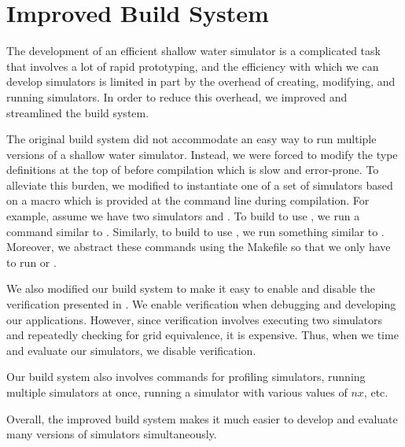 \section{Improved Build System}\label{sec:build}
The development of an efficient shallow water simulator is a complicated task
that involves a lot of rapid prototyping, and the efficiency with which we can
develop simulators is limited in part by the overhead of creating, modifying,
and running simulators. In order to reduce this overhead, we improved and
streamlined the build system.

The original  build system did not accommodate an easy way to run
multiple versions of a shallow water simulator. Instead, we were forced to
modify the type definitions at the top of  before compilation
which is slow and error-prone. To alleviate this burden, we modified
 to instantiate one of a set of simulators based on a macro
which is provided at the command line during compilation. For example, assume
we have two simulators  and . To build  to
use , we run a command similar to . Similarly, to build  to use ,
we run something similar to .
Moreover, we abstract these commands using the Makefile so that we only have to
run  or .

We also modified our build system to make it easy to enable and disable the
verification presented in . We enable verification when
debugging and developing our applications. However, since verification involves
executing two simulators and repeatedly checking for grid equivalence, it is
expensive. Thus, when we time and evaluate our simulators, we disable
verification.

Our build system also involves commands for profiling simulators, running
multiple simulators at once, running a simulator with various values of $nx$,
etc.

Overall, the improved build system makes it much easier to develop and evaluate
many versions of simulators simultaneously.
